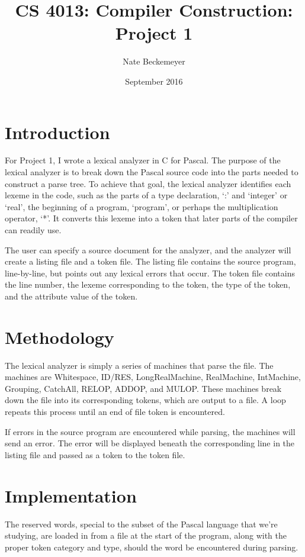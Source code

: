 \documentclass[titlepage]{article}
\author{Nate Beckemeyer}
\title{\textbf{CS 4013: Compiler Construction: Project 1}}
\date{September 2016}
\begin{document}
    \maketitle
    \section*{Introduction}
    For Project 1, I wrote a lexical analyzer in C for Pascal. The purpose
    of the lexical analyzer is to  break down the Pascal source code into
    the parts needed to construct a parse tree. To achieve that goal, the
    lexical analyzer identifies each lexeme in the code, such as the parts
    of a type declaration, `:' and `integer' or `real', the beginning of a
    program, `program', or perhaps the multiplication operator, `*'. It converts
    this lexeme into a token that later parts of the compiler can readily use.

    The user can specify a source document for the analyzer, and the
    analyzer will create a listing file and a token file. The listing file
    contains the source program, line-by-line, but points out any lexical
    errors that occur. The token file contains the line number, the lexeme
    corresponding to the token, the type of the token, and the attribute
    value of the token.

    \section{Methodology}
    The lexical analyzer is simply a series of machines that parse the file.
    The machines are Whitespace, ID/RES, LongRealMachine, RealMachine,
    IntMachine, Grouping, CatchAll, RELOP, ADDOP, and MULOP\@.
    These machines break down the file into its corresponding tokens, which are
    output to a file. A loop repeats this process until an end of file token is
    encountered.

    If errors in the source program are encountered while parsing, the machines
    will send an error. The error will be displayed beneath the corresponding
    line in the listing file and passed as a token to the token file.

    \section{Implementation}
    The reserved words, special to the subset of the Pascal language
    that we're studying, are loaded in from a file at the start of the
    program, along with the proper token category and type, should the
    word be encountered during parsing.
\end{document}
